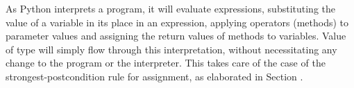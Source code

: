 \documentclass{IOS-Book-Article}
\begin{document}
\begin{mdP}[data-line={684}]%
{}As Python interprets a program, it will evaluate expressions, 
substituting the value of a variable in its place in an 
expression, applying operators (methods) to 
parameter values and assigning the return values of methods
to variables. Value of type %
{}%
{} will simply flow
through this interpretation, without necessitating any change 
to the program or the interpreter. This takes care
of the case of the strongest-postcondition rule for assignment,
as elaborated in Section%
{}{\mdNbsp}%
{}.%
\end{mdP}%
\end{document}
